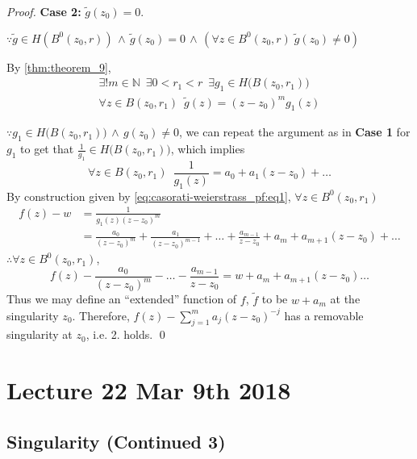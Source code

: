 \documentclass[11pt, oneside]{book}
\begin{document}
\begin{proof}
	\textbf{Case 2:} $\tilde{g}(z_0) = 0$.

	$\because \tilde{g} \in H(B^0(z_0, r)) \, \land \, \tilde{g}(z_0) = 0 \, \land \, (\forall z \in B^0(z_0, r) \; \tilde{g}(z_0) \neq 0)$

	By \cref{thm:theorem_9}, 
	\begin{gather}
		\exists ! m \in \mathbb{N} \enspace \exists 0 < r_1 < r \enspace \exists g_1 \in H\big(B(z_0, r_1)\big) \nonumber \\
		\forall z \in B(z_0, r_1) \enspace \tilde{g}(z) = (z - z_0)^m g_1(z) \label{eq:casorati-weierstrass_pf:eq1}
	\end{gather}

	$\because g_1 \in H\big( B(z_0, r_1) \big) \, \land \, g(z_0) \neq 0$, we can repeat the argument as in \textbf{Case 1} for $g_1$ to get that $\frac{1}{g_1} \in H\big( B(z_0, r_1) \big)$, which implies
	\begin{equation*}
		\forall z \in B(z_0, r_1) \enspace \frac{1}{g_1(z)} = a_0 + a_1 (z - z_0) + \hdots
	\end{equation*}
	By construction given by \cref{eq:casorati-weierstrass_pf:eq1}, $\forall z \in B^0(z_0, r_1)$
	\begin{align*}
		f(z) - w
			&= \frac{1}{g_1(z) (z - z_0)^m} \\
			&= \frac{a_0}{(z - z_0)^m} + \frac{a_1}{(z - z_0)^{m - 1}} + \hdots + \frac{a_{m - 1}}{z - z_0} + a_m + a_{m + 1} (z - z_0) + \hdots 
	\end{align*}
	$\therefore \forall z \in B^0(z_0, r_1)$,
	\begin{equation*}
		f(z) - \frac{a_0}{(z - z_0)^m} - \hdots - \frac{a_{m - 1}}{z - z_0} = w + a_m + a_{m + 1}(z - z_0) \hdots 
	\end{equation*}
	Thus we may define an ``extended'' function of $f$, $\tilde{f}$ to be $w + a_m$ at the singularity $z_0$. Therefore, $f(z) - \sum_{j=1}^{m} a_j (z - z_0)^{-j}$ has a removable singularity at $z_0$, i.e. 2. holds. \qed
\end{proof}



\chapter{Lecture 22 Mar 9th 2018}
\label{chp:lecture_22_mar_9th_2018}

\section{Singularity (Continued 3)} %
\end{document}
